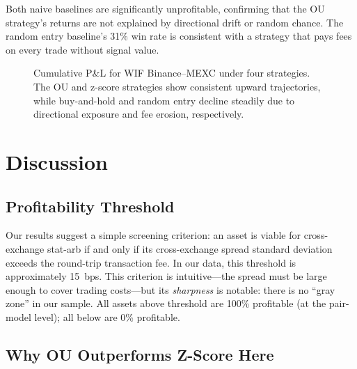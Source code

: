 \documentclass[sigconf,nonacm=false]{acmart}
\begin{document}
Both naive baselines are significantly unprofitable, confirming that the OU strategy's returns are not explained by directional drift or random chance. The random entry baseline's 31\% win rate is consistent with a strategy that pays fees on every trade without signal value.

\begin{figure}[h]
\centering
{}
\caption{Cumulative P\&L for WIF Binance--MEXC under four strategies. The OU and z-score strategies show consistent upward trajectories, while buy-and-hold and random entry decline steadily due to directional exposure and fee erosion, respectively.}
\label{fig:cumulative_pnl}
\end{figure}

\section{Discussion}\label{sec:discussion}

\subsection{Profitability Threshold}

Our results suggest a simple screening criterion: an asset is viable for cross-exchange stat-arb if and only if its cross-exchange spread standard deviation exceeds the round-trip transaction fee. In our data, this threshold is approximately 15~bps. This criterion is intuitive---the spread must be large enough to cover trading costs---but its \emph{sharpness} is notable: there is no ``gray zone'' in our sample. All assets above threshold are 100\% profitable (at the pair-model level); all below are 0\% profitable.

\subsection{Why OU Outperforms Z-Score Here}
\end{document}
